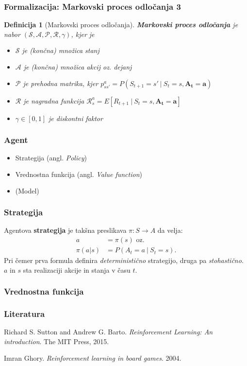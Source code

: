 \documentclass{beamer}    %
\newtheorem{definicija}[izrek]{Definicija}
\begin{document}
\begin{frame}
    \frametitle{Formalizacija: Markovski proces odločanja 3}
    \begin{definicija}[Markovski proces odločanja]
        \textbf{Markovski proces odločanja} je nabor 
        $(\mathcal{S}, \mathcal{A}, \mathcal{P}, \mathcal{R}, \gamma)$, kjer je
        \begin{itemize}
            \item $\mathcal{S}$ je (končna) množica stanj
            \item $\mathcal{A}$ je (končna) množica akcij oz. dejanj
            \item $\mathcal{P}$ je prehodna matrika, kjer $p_{ss'}^a = P(S_{t+1} = s'~|~S_{t} = s,
                    \mathbf{A_t = a})$
            \item $\mathcal{R}$ je nagradna funkcija $\mathcal{R}_s^a = E[R_{t+1}~|~S_{t} = s, 
                    \mathbf{A_t = a}]$
            \item $\gamma \in [0, 1]$ je diskontni faktor
        \end{itemize}
    \end{definicija}
\end{frame}


\begin{frame}
    \frametitle{Agent}
    \begin{itemize}
        \item Strategija (angl. \textit{Policy})
        \item Vrednostna funkcija (angl. \textit{Value function})
        \item (Model)
    \end{itemize}
\end{frame}


\begin{frame}
    \frametitle{Strategija}
        Agentova \textbf{strategija} je takšna preslikava $\pi: S \rightarrow A$ da velja:
            \begin{align*}
            a &= \pi(s) \text{ oz.}\\
            \pi(a | s) &= P(A_t = a~|~S_t = s). 
            \end{align*}
        Pri čemer prva formula definira \textit{deterministično} strategijo, druga pa 
        \textit{stohastično}. $a$ in $s$ sta realizaciji akcije in stanja v času $t$.
\end{frame}


\begin{frame}
    \frametitle{Vrednostna funkcija}
\end{frame}


\begin{frame}
    \frametitle{Literatura}
    \begin{thebibliography}{9}
        Richard S. Sutton and Andrew G. Barto. 
    \textit{Reinforcement Learning: An introduction}.
    The MIT Press, 
    2015.

    \medskip
    \medskip

    Imran Ghory.
    \textit{Reinforcement learning in board games}.
    2004.

    \end{thebibliography}
\end{frame}
\end{document}
